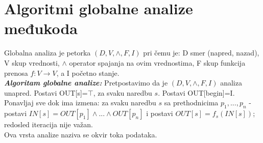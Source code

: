 \documentclass[10pt]{extarticle}
\begin{document}
\section{Algoritmi globalne analize međukoda}
\noindent
Globalna analiza je petorka $(D, V, \wedge, F, I)$ pri čemu je: D smer (napred, nazad), V skup vrednosti, $\wedge$ operator spajanja na ovim vrednostima, F skup funkcija prenosa $f : V \rightarrow V$, a I početno stanje. \\
\textit{\textbf{Algoritam globalne analize:}} Pretpostavimo da je $(D, V, \wedge, F, I)$ analiza unapred. Postavi OUT[s]=$\top$, za svaku naredbu $s$. Postavi OUT[begin]=I. Ponavljaj sve dok ima izmena: za svaku naredbu $s$ sa prethodnicima $p_1,..., p_n$ - postavi $IN[s]=OUT[p_1] \wedge ... \wedge OUT[p_n]$ i postavi $OUT[s]=f_s(IN[s])$; redosled iteracija nije važan.\\
Ova vrsta analize naziva se okvir toka podataka.
\end{document}
